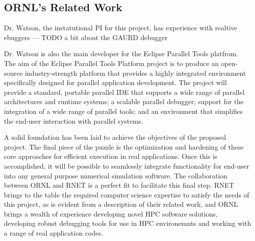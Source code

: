 \subsection{ORNL's Related Work}
\label{sec:nice}

Dr. Watson, the instatutional PI for this project, has experience with realtive ebuggers --- TODO a bit about the GAURD debugger


Dr. Watson is also the main developer for the Eclipse Parallel Tools platfrom. The aim of the Eclipse Parallel Tools Platform project is to produce an open-source industry-strength platform that provides a highly integrated environment specifically designed for parallel application development. The project will provide a standard, portable parallel IDE that supports a wide range of parallel architectures and runtime systems; a scalable parallel debugger; support for the integration of a wide range of parallel tools; and an environment that simplifies the end-user interaction with parallel systems. 

A solid foundation has been laid to achieve the objectives of the proposed project. The final 
 piece of the puzzle is the optimization and hardening of these core approaches for efficient execution in real applications. 
 Once this is accomplished, it will be possible to seamlessly integrate functionality for end-user \VV into any general purpose 
 numerical simulation software. The collaboration between ORNL and 
RNET is a perfect fit to facilitate this final step. RNET brings to the table the required computer science expertise to 
satisfy the needs of this project, as is evident from a description of their related work, and ORNL brings a wealth of experience developing novel
HPC software solutions, developing robust debugging tools for use in HPC environemnts and working with a range of real application codes. 
